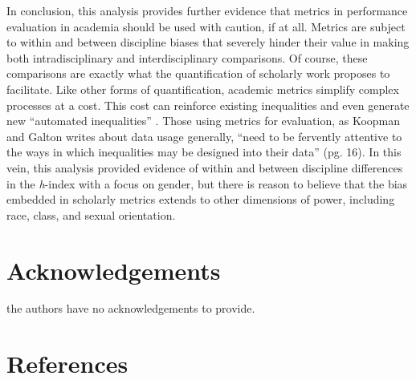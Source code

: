\documentclass[
  10pt,
  letterpaper,
]{article}
\begin{document}
In conclusion, this analysis provides further evidence that metrics in
performance evaluation in academia should be used with caution, if at
all. Metrics are subject to within and between discipline biases that
severely hinder their value in making both intradisciplinary and
interdisciplinary comparisons. Of course, these comparisons are exactly
what the quantification of scholarly work proposes to facilitate. Like
other forms of quantification, academic metrics simplify complex
processes at a cost. This cost can reinforce existing inequalities and
even generate new ``automated inequalities''
\citep{eubanks_automating_2018}. Those using metrics for evaluation, as
Koopman and Galton \citep{koopman_galton_2023} writes about data usage
generally, ``need to be fervently attentive to the ways in which
inequalities may be designed into their data'' (pg. 16). In this vein,
this analysis provided evidence of within and between discipline
differences in the \emph{h}-index with a focus on gender, but there is
reason to believe that the bias embedded in scholarly metrics extends to
other dimensions of power, including race, class, and sexual
orientation.

\hypertarget{acknowledgements}{%
\section{Acknowledgements}\label{acknowledgements}}

the authors have no acknowledgements to provide.

\hypertarget{references}{%
\section{References}\label{references}}
\end{document}
